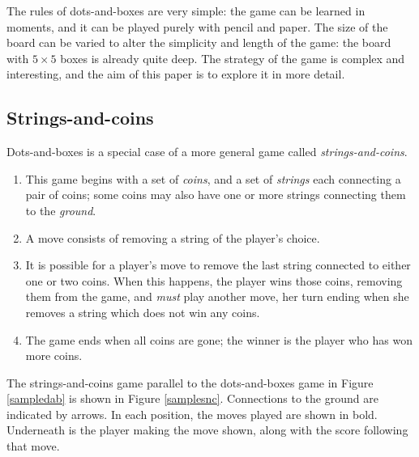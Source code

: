 \documentclass[a4paper,twocolumn]{article}
\begin{document}
\begin{figure*}
  \centering
  \def\svgscale{0.7}
  
  \caption{Sample dots-and-boxes game, which player $A$ wins 3--1}
  \label{sampledab}
\end{figure*}

The rules of dots-and-boxes are very simple: the game can be learned
in moments, and it can be played purely with pencil and paper. The
size of the board can be varied to alter the simplicity and length of
the game: the board with $5 \times 5$ boxes is already quite deep. The
strategy of the game is complex and interesting, and the aim of this
paper is to explore it in more detail.

\subsection{Strings-and-coins}

Dots-and-boxes is a special case of a more general game called
\emph{strings-and-coins}.

\begin{enumerate}
  \item This game begins with a set of \emph{coins}, and a set of
    \emph{strings} each connecting a pair of coins; some coins may
    also have one or more strings connecting them to the
    \emph{ground}.
  \item A move consists of removing a string of the player's choice.
  \item It is possible for a player's move to remove the last string
    connected to either one or two coins. When this happens, the
    player wins those coins, removing them from the game, and
    \emph{must} play another move, her turn ending when she removes a
    string which does not win any coins.
  \item The game ends when all coins are gone; the winner is the
    player who has won more coins.
\end{enumerate}

The strings-and-coins game parallel to the dots-and-boxes game in
Figure \ref{sampledab} is shown in Figure \ref{samplesnc}. Connections
to the ground are indicated by arrows. In each position, the moves
played are shown in bold. Underneath is the player making the move
shown, along with the score following that move.

\begin{figure*}
  \centering
  \def\svgscale{0.7}
  
  \caption{Sample strings-and-coins game equivalent to Figure \ref{sampledab}}
  \label{samplesnc}
\end{figure*}
\end{document}
